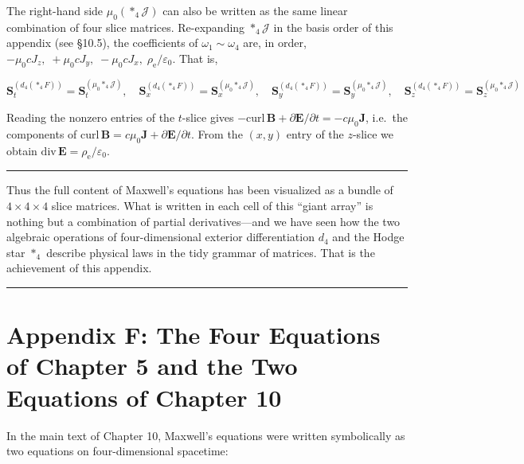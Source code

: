 The right-hand side \(\mu_0(\ast_4\mathcal{J})\) can also be written as
the same linear combination of four slice matrices. Re-expanding
\(\ast_4\mathcal{J}\) in the basis order of this appendix (see §10.5),
the coefficients of \(\omega_1\!\sim\!\omega_4\) are, in order,
\(-\mu_0 c J_z,\; +\mu_0 c J_y,\; -\mu_0 c J_x,\; \rho_{\mathrm e}/\varepsilon_0\).
That is,

\[
\mathbf{S}_{t}^{(d_4(\ast_4F))} = \mathbf{S}_{t}^{(\mu_0\ast_4\mathcal{J})},\quad
\mathbf{S}_{x}^{(d_4(\ast_4F))} = \mathbf{S}_{x}^{(\mu_0\ast_4\mathcal{J})},\quad
\mathbf{S}_{y}^{(d_4(\ast_4F))} = \mathbf{S}_{y}^{(\mu_0\ast_4\mathcal{J})},\quad
\mathbf{S}_{z}^{(d_4(\ast_4F))} = \mathbf{S}_{z}^{(\mu_0\ast_4\mathcal{J})}
\]

Reading the nonzero entries of the \(t\)-slice gives
\(-\mathrm{curl}\,\mathbf{B} + \partial\mathbf{E}/\partial t = -c\mu_0\mathbf{J}\),
i.e.~the components of
\(\mathrm{curl}\,\mathbf{B} = c\mu_0\mathbf{J} + \partial\mathbf{E}/\partial t\).
From the \((x,y)\) entry of the \(z\)-slice we obtain
\(\mathrm{div}\,\mathbf{E} = \rho_{\mathrm e}/\varepsilon_0\).

\begin{center}\rule{0.5\linewidth}{0.5pt}\end{center}

Thus the full content of Maxwell's equations has been visualized as a
bundle of \(4\times4\times4\) slice matrices. What is written in each
cell of this ``giant array'' is nothing but a combination of partial
derivatives---and we have seen how the two algebraic operations of
four-dimensional exterior differentiation \(d_4\) and the Hodge star
\(\ast_4\) describe physical laws in the tidy grammar of matrices. That
is the achievement of this appendix.

\begin{center}\rule{0.5\linewidth}{0.5pt}\end{center}

\hypertarget{appendix-f-the-four-equations-of-chapter-5-and-the-two-equations-of-chapter-10}{%
\section{Appendix F: The Four Equations of Chapter 5 and the Two
Equations of Chapter
10}\label{appendix-f-the-four-equations-of-chapter-5-and-the-two-equations-of-chapter-10}}

In the main text of Chapter 10, Maxwell's equations were written
symbolically as two equations on four-dimensional spacetime:

